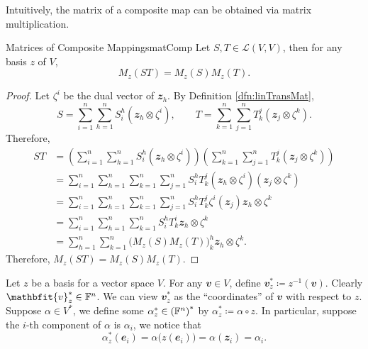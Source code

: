 \documentclass[math]{amznotes}
\theoremstyle{remark}
\begin{document}
Intuitively, the matrix of a composite map can be obtained via matrix multiplication.
\begin{probox}{Matrices of Composite Mappings}{matComp}
    Let $S, T \in \mathcal{L}(V, V)$, then for any basis $z$ of $V$, 
    \begin{equation*}
        M_z(ST) = M_z(S)M_z(T).
    \end{equation*}
    \tcblower
    \begin{proof}
        Let $\zeta^i$ be the dual vector of $\mathbfit{z}_h$. By Definition \ref{dfn:linTransMat}, 
        \begin{equation*}
            S = \sum_{i = 1}^{n}\sum_{h = 1}^{n}S^h_i(\mathbfit{z}_h \otimes \zeta^i), \qquad T = \sum_{k = 1}^{n}\sum_{j = 1}^{n}T^j_k(\mathbfit{z}_j \otimes \zeta^k).
        \end{equation*}
        Therefore,
        \begin{align*}
            ST & = \left(\sum_{i = 1}^{n}\sum_{h = 1}^{n}S^h_i(\mathbfit{z}_h \otimes \zeta^i)\right)\left(\sum_{k = 1}^{n}\sum_{j = 1}^{n}T^j_k(\mathbfit{z}_j \otimes \zeta^k)\right) \\
            & = \sum_{i = 1}^{n}\sum_{h = 1}^{n}\sum_{k = 1}^{n}\sum_{j = 1}^{n}S^h_iT^j_k(\mathbfit{z}_h \otimes \zeta^i)(\mathbfit{z}_j \otimes \zeta^k) \\
            & = \sum_{i = 1}^{n}\sum_{h = 1}^{n}\sum_{k = 1}^{n}\sum_{j = 1}^{n}S^h_iT^j_k\zeta^i(\mathbfit{z}_j)\mathbfit{z}_h \otimes \zeta^k \\
            & = \sum_{i = 1}^{n}\sum_{h = 1}^{n}\sum_{k = 1}^{n}S^h_iT^i_k\mathbfit{z}_h \otimes \zeta^k \\
            & = \sum_{h = 1}^{n}\sum_{k = 1}^{n}\bigl(M_z(S)M_z(T)\bigr)^h_k\mathbfit{z}_h \otimes \zeta^k.
        \end{align*}
        Therefore, $M_z(ST) = M_z(S)M_z(T)$.
    \end{proof}
\end{probox}
Let $z$ be a basis for a vector space $V$. For any $\mathbfit{v} \in V$, define $\mathbfit{v}^*_z \coloneqq z^{-1}(\mathbfit{v})$. Clearly $\mathbfit{v}^*_z \in \F^n$. We can view $\mathbfit{v}^*_z$ as the ``coordinates'' of $\mathbfit{v}$ with respect to $z$. Suppose $\alpha \in V^*$, we define some $\alpha^*_z \in \left(\mathbb{F}^n\right)^*$ by $\alpha^*_z \coloneqq \alpha \circ z$. In particular, suppose the $i$-th component of $\alpha$ is $\alpha_i$, we notice that
\begin{equation*}
    \alpha^*_z(\mathbfit{e}_i) = \alpha\bigl(z(\mathbfit{e}_i)\bigr) = \alpha(\mathbfit{z}_i) = \alpha_i.
\end{equation*}
\end{document}
